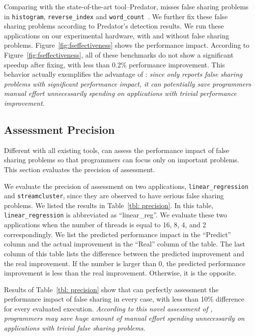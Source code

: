 Comparing with the state-of-the-art tool--Predator, \cheetah{} misses false sharing problems in  \texttt{histogram}, \texttt{reverse\_index} and \texttt{word\_count}~\cite{Predator}. We further fix these false sharing problems according to Predator's detection results. We run these applications on our experimental hardware, with and without false sharing problems. Figure~\ref{fig:fseffectiveness} shows the performance impact. According to Figure~\ref{fig:fseffectiveness}, all of these benchmarks do not show a significant speedup after fixing, with less than 0.2\% performance improvement. This behavior actually exemplifies the advantage of \Cheetah{}: \emph{since \cheetah{} only reports false sharing problems with significant performance impact, it can potentially save programmers manual effort unnecessarily spending on applications with trivial performance improvement}. 

\subsection{Assessment Precision}
\label{sec:precision}

Different with all existing tools, \cheetah{} can assess the performance impact of false sharing problems so that programmers can focus only on important problems. This section evaluates the precision of assessment. 

We evaluate the precision of assessment on two applications, \texttt{linear\_regression} and \texttt{streamcluster}, since they are observed to have serious false sharing problems. We listed the results in Table~\ref{tbl: precision}. In this table, \texttt{linear\_regression} is abbreviated as ``linear\_reg''.  We evaluate these two applications when the number of threads is equal to 16, 8, 4, and 2 correspondingly. We list the predicted performance impact in the ``Predict'' column and the actual improvement in the ``Real'' column of the table. The last column of this table lists the difference between the predicted improvement and the real improvement. If the number is larger than 0, the predicted performance improvement is less than the real improvement. Otherwise, it is the opposite. 

Results of Table~\ref{tbl: precision} show that \cheetah{} can perfectly assessment the performance impact of false sharing in every case, with less than 10\% difference for every evaluated execution. %
\emph{According to this novel assessment of \cheetah{}, programmers may save huge amount of manual effort spending unnecessarily on applications with trivial false sharing problems}. 

